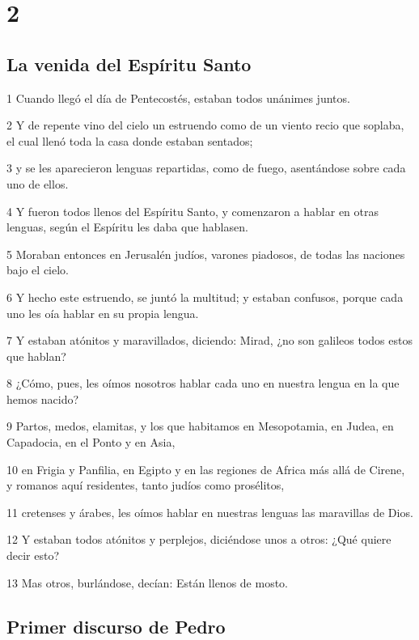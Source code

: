 \chapter{2}

\section*{La venida del Espíritu Santo}

\par 1 Cuando llegó el día de Pentecostés, estaban todos unánimes juntos.
\par 2 Y de repente vino del cielo un estruendo como de un viento recio que soplaba, el cual llenó toda la casa donde estaban sentados;
\par 3 y se les aparecieron lenguas repartidas, como de fuego, asentándose sobre cada uno de ellos.
\par 4 Y fueron todos llenos del Espíritu Santo, y comenzaron a hablar en otras lenguas, según el Espíritu les daba que hablasen.
\par 5 Moraban entonces en Jerusalén judíos, varones piadosos, de todas las naciones bajo el cielo.
\par 6 Y hecho este estruendo, se juntó la multitud; y estaban confusos, porque cada uno les oía hablar en su propia lengua.
\par 7 Y estaban atónitos y maravillados, diciendo: Mirad, ¿no son galileos todos estos que hablan?
\par 8 ¿Cómo, pues, les oímos nosotros hablar cada uno en nuestra lengua en la que hemos nacido?
\par 9 Partos, medos, elamitas, y los que habitamos en Mesopotamia, en Judea, en Capadocia, en el Ponto y en Asia,
\par 10 en Frigia y Panfilia, en Egipto y en las regiones de Africa más allá de Cirene, y romanos aquí residentes, tanto judíos como prosélitos,
\par 11 cretenses y árabes, les oímos hablar en nuestras lenguas las maravillas de Dios.
\par 12 Y estaban todos atónitos y perplejos, diciéndose unos a otros: ¿Qué quiere decir esto?
\par 13 Mas otros, burlándose, decían: Están llenos de mosto.

\section*{Primer discurso de Pedro}

